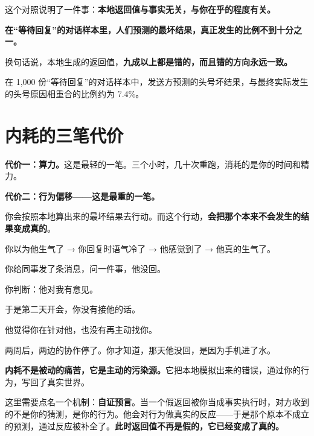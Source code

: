 这个对照说明了一件事：\textbf{本地返回值与事实无关，与你在乎的程度有关。}

\begin{mdquote}
\textbf{在“等待回复”的对话样本里，人们预测的最坏结果，真正发生的比例不到十分之一。}
\end{mdquote}

换句话说，本地生成的返回值，\textbf{九成以上都是错的，而且错的方向永远一致。}

在 1,000 份“等待回复”的对话样本中，发送方预测的头号坏结果，与最终实际发生的头号原因相重合的比例约为 7.4\%。

\section{内耗的三笔代价}

\textbf{代价一：算力。}这是最轻的一笔。三个小时，几十次重跑，消耗的是你的时间和精力。

\textbf{代价二：行为偏移——这是最重的一笔。}

你会按照本地算出来的最坏结果去行动。而这个行动，\textbf{会把那个本来不会发生的结果变成真的}。

\begin{mdquote}
你以为他生气了 → 你回复时语气冷了 → 他感觉到了 → 他真的生气了。
\end{mdquote}

\par
\begin{mdquote}
你给同事发了条消息，问一件事，他没回。\par
\vspace{0.3\baselineskip}
你判断：他对我有意见。\par
\vspace{0.3\baselineskip}
于是第二天开会，你没有接他的话。\par
\vspace{0.3\baselineskip}
他觉得你在针对他，也没有再主动找你。\par
\vspace{0.3\baselineskip}
两周后，两边的协作停了。你才知道，那天他没回，是因为手机进了水。
\end{mdquote}

\textbf{内耗不是被动的痛苦，它是主动的污染源。}它把本地模拟出来的错误，通过你的行为，写回了真实世界。

这里需要点名一个机制：\textbf{自证预言}。当一个假返回被你当成事实执行时，对方收到的不是你的猜测，是你的行为。他会对行为做真实的反应——于是那个原本不成立的预测，通过反应被补全了。\textbf{此时返回值不再是假的，它已经变成了真的。}

